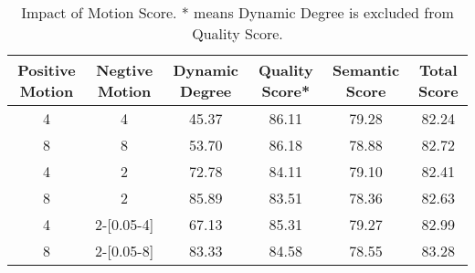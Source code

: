 \begin{table*}[t]
    \vspace{-0.5em}
    \caption{Impact of Motion Score. * means Dynamic Degree is excluded from Quality Score.}
    \label{tab:motion_score}
    \begin{center}
        \begin{small}
            \begin{sc}
                \begin{tabular}{cccccc}
                \toprule
                Positive Motion & Negtive Motion & Dynamic Degree & Quality Score* & Semantic Score & Total Score \\
                \midrule
                4               & 4              & 45.37          & 86.11          & 79.28          & 82.24       \\
                8               & 8              & 53.70          & 86.18          & 78.88          & 82.72       \\
                4               & 2              & 72.78          & 84.11          & 79.10          & 82.41       \\
                8               & 2              & 85.89          & 83.51          & 78.36          & 82.63       \\
                4               & 2-{[}0.05-4{]} & 67.13          & 85.31          & 79.27          & 82.99       \\
                8               & 2-{[}0.05-8{]} & 83.33          & 84.58          & 78.55          & 83.28      \\
                \bottomrule
                \end{tabular}
            \end{sc}
        \end{small}
    \end{center}
    \vspace{-0.5em}
\end{table*}
